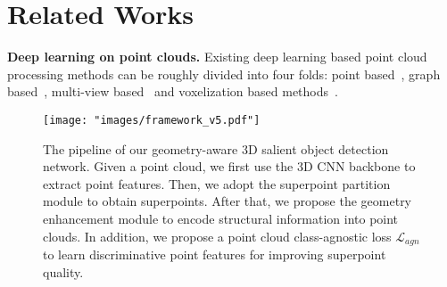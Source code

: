 \section{Related Works}
\textbf{Deep learning on point clouds.} Existing deep learning based point cloud processing methods can be roughly divided into four folds: point based~\cite{lai2022stratified,jiang2020pointgroup,yan2020pointasnl,hu2020jsenet}, graph based~\cite{li2021pointvgg,ding2021graph,lei2020seggcn}, multi-view based~\cite{li2020end,xu2023multi,chen2020compositional,le2017multi} and voxelization based methods~\cite{malik2021handvoxnet++,meng2019vv,poux2019voxel}.
\begin{figure*}[t!]
	\vspace{-15pt}
	\centering
	\texttt{[image: "images/framework\_v5.pdf"]}
	\caption{The pipeline of our geometry-aware 3D salient object detection network. Given a point cloud, we first use the 3D CNN backbone to extract point features. Then, we adopt the superpoint partition module to obtain superpoints. After that, we propose the geometry enhancement module to encode structural information into point clouds. In addition, we propose a point cloud class-agnostic loss $\mathcal{L}_{agn}$ to learn discriminative point features for improving superpoint quality.}
	\label{fig:framework}
	\vspace{-10pt}
\end{figure*}
